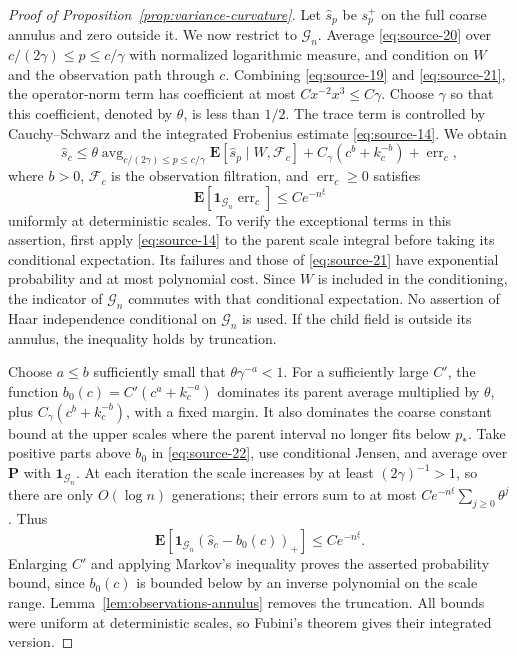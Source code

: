 \begin{proof}[Proof of Proposition~\ref{prop:variance-curvature}]
Let $\widehat s_p$ be $s_p^+$ on the full coarse annulus and zero
outside it. We now restrict to $\mathcal G_n$. Average
\eqref{eq:source-20} over
$c/(2\gamma)\le p\le c/\gamma$ with normalized logarithmic measure,
and condition on $W$ and the observation path through $c$.
Combining \eqref{eq:source-19} and \eqref{eq:source-21}, the operator-norm
term has coefficient at most $Cx^{-2}x^3\le C\gamma$.
Choose $\gamma$ so that this coefficient, denoted by $\theta$, is less
than $1/2$. The trace term is controlled by Cauchy--Schwarz and the
integrated Frobenius estimate \eqref{eq:source-14}. We obtain
\begin{equation}\label{eq:source-22}
 \widehat s_c\le
 \theta\operatorname{avg}_{c/(2\gamma)\le p\le c/\gamma}
    \mathbf E[\widehat s_p\mid W,\mathcal F_c]
 +C_\gamma(c^{b}+k_c^{-b})+\operatorname{err}_c,
\end{equation}
where $b>0$, $\mathcal F_c$ is the observation filtration, and
$\operatorname{err}_c\ge0$ satisfies
\[
 \mathbf E[\mathbf1_{\mathcal G_n}\operatorname{err}_c]
 \le Ce^{-n^\xi}
\]
uniformly at deterministic scales. To verify the exceptional terms in
this assertion, first apply \eqref{eq:source-14} to the parent scale
integral before taking its conditional expectation. Its failures and
those of \eqref{eq:source-21} have exponential probability and at most
polynomial cost. Since $W$ is included in the conditioning, the indicator
of $\mathcal G_n$ commutes with that conditional expectation. No assertion
of Haar independence conditional on $\mathcal G_n$ is used. If the child
field is outside its annulus, the inequality holds by truncation.

Choose $a\le b$ sufficiently small that $\theta\gamma^{-a}<1$.
For a sufficiently large $C'$, the function
$b_0(c)=C'(c^a+k_c^{-a})$ dominates its parent average multiplied by
$\theta$, plus $C_\gamma(c^b+k_c^{-b})$, with a fixed margin.
It also dominates the coarse constant bound at the upper scales where
the parent interval no longer fits below $p_*$. Take positive parts
above $b_0$ in \eqref{eq:source-22}, use conditional Jensen, and average
over $\mathbf P$ with $\mathbf1_{\mathcal G_n}$. At each iteration the
scale increases by at least $(2\gamma)^{-1}>1$, so there are only
$O(\log n)$ generations; their errors sum to at most
$Ce^{-n^\xi}\sum_{j\ge0}\theta^j$. Thus
\[
 \mathbf E[\mathbf1_{\mathcal G_n}
       (\widehat s_c-b_0(c))_+]\le Ce^{-n^\xi}.
\]
Enlarging $C'$ and applying Markov's inequality proves the asserted
probability bound, since $b_0(c)$ is bounded below by an inverse
polynomial on the scale range. Lemma~\ref{lem:observations-annulus}
removes the truncation. All bounds were uniform at deterministic scales,
so Fubini's theorem gives their integrated version.
\end{proof}

